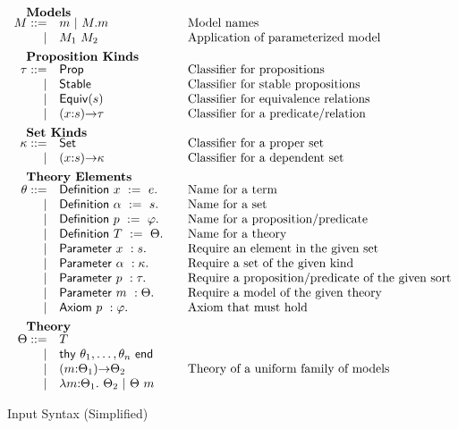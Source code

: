 \begin{figure}
\[\begin{array}{rl@{\qquad}l}
		\noalign{\textbf{Models}}		
		\im ::= 
		    & \iM  \ibar \iselect{\im}{\iM}&\mbox{Model names}\\
		  | & \iapp{\im_1}{\im_2}&\mbox{Application of parameterized model}\\[5pt]
		
		\noalign{\textbf{Proposition Kinds}}
		\ipt ::=
		    & \iProp & \mbox{Classifier for propositions}\\
		  | & \iStable & \mbox{Classifier for stable propositions}\\
		  | & \iEquiv{\is} &\mbox{Classifier for equivalence relations}\\
		  | & \idarrow{\ix}{\is}{\ipt} & \mbox{Classifier for a predicate/relation}\\[5pt] 
		
		\noalign{\textbf{Set Kinds}}
		\ik ::= 
		    & \iSet &\mbox{Classifier for a proper set}\\
		   | & \idarrow{\ix}{\is}{\ik} &\mbox{Classifier for a dependent set}\\[5pt]
		

		\noalign{\textbf{Theory Elements}}
		\ite ::=
		     & \iDefinition{\ix}{\ie}&\mbox{Name for a term}\\
		   | & \iDefinition{\iS}{\is}&\mbox{Name for a set}\\
		   | & \iDefinition{\iP}{\ip}&\mbox{Name for a proposition/predicate}\\
		   | & \iDefinition{\iTH}{\ith}&\mbox{Name for a theory}\\
		   | & \iParameter{\ix}{\is}&\mbox{Require an element in the given set}\\
		   | & \iParameter{\iS}{\ik}&\mbox{Require a set of the given kind}\\
		   | & \iParameter{\iP}{\ipt}&\mbox{Require a proposition/predicate of the given sort}\\
		   | & \iParameter{\iM}{\ith}&\mbox{Require a model of the given theory}\\
		   | & \iAxiom{\iP}{\ip}&\mbox{Axiom that must hold}\\[5pt]

  		\noalign{\textbf{Theory}}
		\ith ::= 
		     & \iTH\\
		   	| & \ithy{\ite_1,\ldots,\ite_n}\\
		 	| & \idarrow{\iM}{\ith_1}{\ith_2} &\mbox{Theory of a uniform family of models}\\
		  	| & \ilambda{\iM}{\ith_1}{\ith_2} \ibar 
		      \iapp{\ith}{\iM}\\
	\end{array}
	\]
	\label{fig:input}
	\caption{Input Syntax (Simplified)}
\end{figure}





